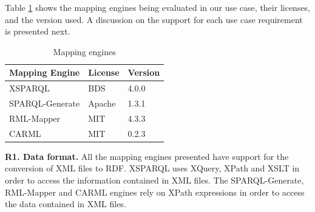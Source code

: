 \documentclass[runningheads]{llncs}
\begin{document}
Table \ref{table-engines} shows the mapping engines being evaluated in our use case, their licenses, and the version used. A discussion on the support for each use case requirement is presented next.

\begin{table}[H]
\centering
\begin{tabular}{|l|l|l|}
\hline
\textbf{Mapping Engine} & \textbf{License} & \textbf{Version} \\ \hline
XSPARQL & BDS                   & 4.0.0 \\ \hline
SPARQL-Generate  & Apache &    1.3.1 \\ \hline
RML-Mapper & MIT & 4.3.3 \\ \hline
CARML & MIT & 0.2.3 \\ \hline
\end{tabular}
\label{table-engines}
\caption{\label{table-engines}Mapping engines}
\end{table}






\textbf{R1. Data format.} All the mapping engines presented have support for the conversion of XML files to RDF. XSPARQL uses XQuery, XPath and XSLT in order to access the information contained in XML files. The SPARQL-Generate, RML-Mapper and CARML engines rely on XPath expressions in order to access the data contained in XML files.
\end{document}
